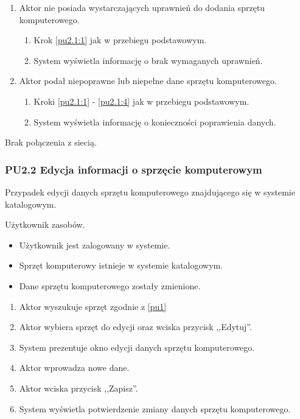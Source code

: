 \begin{enumerate}
\item Aktor nie posiada wystarczających uprawnień do dodania sprzętu komputerowego.
	\begin{enumerate}[label*=\arabic*.]
		\item Krok \ref{pu2.1:1} jak w przebiegu podstawowym.
		\item System wyświetla informację o brak wymaganych uprawnień.
	\end{enumerate}
\item Aktor podał niepoprawne lub niepełne dane sprzętu komputerowego.
	\begin{enumerate}[label*=\arabic*.]
		\item Kroki \ref{pu2.1:1} - \ref{pu2.1:4} jak w przebiegu podstawowym.
		\item System wyświetla informację o konieczności poprawienia danych.
	\end{enumerate}
\end{enumerate}

Brak połączenia z siecią.



\subsubsection{PU2.2 Edycja informacji o sprzęcie komputerowym}

Przypadek edycji danych sprzętu komputerowego znajdującego się w systemie katalogowym.

Użytkownik zasobów.

\begin{itemize}
\item Użytkownik jest zalogowany w systemie.
\item Sprzęt komputerowy istnieje w systemie katalogowym.
\end{itemize}

\begin{itemize}
\item Dane sprzętu komputerowego zostały zmienione.
\end{itemize}

\begin{enumerate}
\item \label{pu2.2:1} Aktor wyszukuje sprzęt zgodnie z \ref{pu1}
\item \label{pu2.2:2} Aktor wybiera sprzęt do edycji oraz wciska przycisk ,,Edytuj''.
\item System prezentuje okno edycji danych sprzętu komputerowego.
\item Aktor wprowadza nowe dane.
\item \label{pu2.2:5} Aktor wciska przycisk ,,Zapisz''.
\item System wyświetla potwierdzenie zmiany danych sprzętu komputerowego.
\end{enumerate}

